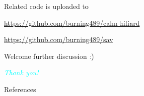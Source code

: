 \documentclass[9pt]{beamer}
\begin{document}
\begin{frame}
Related code is uploaded to

\url{https://github.com/burning489/cahn-hiliard} 

\url{https://github.com/burning489/sav}

Welcome further discussion :)

\end{frame}

\begin{frame}
 \begin{center}
{\huge \emph{\textcolor{cyan}{Thank you!}}}\\
\end{center}
\end{frame}

\nocite{*}
\begin{frame}[allowframebreaks]{References}
	
	
\end{frame}
\end{document}
